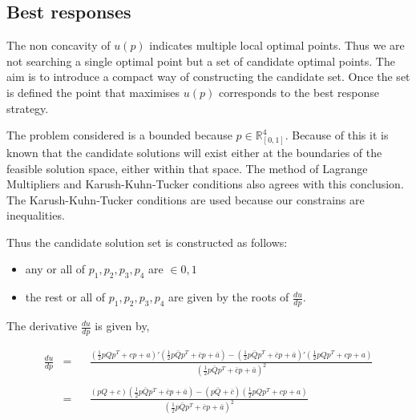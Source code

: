 \documentclass[10pt]{article}
\newcommand{\R}{\mathbb{R}}
\begin{document}
\subsection{Best responses}\label{section:memory_one_analytical}

The non concavity of \(u(p)\) indicates multiple local optimal points. Thus we
are not searching a single optimal point but a set of candidate optimal points.
The aim is to introduce a compact way of constructing the candidate set. Once
the set is defined the point that maximises \(u(p)\) corresponds to the best
response strategy.

The problem considered is a bounded because \(p \in \R^4_{[0, 1]}\). Because of
this it is known that the candidate solutions will exist either at the boundaries
of the feasible solution space, either within that space. The method of Lagrange
Multipliers and Karush-Kuhn-Tucker conditions also agrees with this conclusion. %
The Karush-Kuhn-Tucker conditions are used because our constrains are inequalities.

Thus the candidate solution set is constructed as follows:

\begin{itemize}
    \item any or all of \(p_1, p_2, p_3, p_4\) are \(\in {0, 1}\)
    \item the rest or all of \(p_1, p_2, p_3, p_4\) are given by the roots of \(\frac{du}{dp}\).
\end{itemize}

The derivative \(\frac{du}{dp}\) is given by,

\begin{equation}\label{eq:derivative_of_quadratic}
    \begin{aligned}
     \frac{du}{dp} & = && \frac{(  \frac{1}{2}p  Q  p^T + c p + a)'
      (  \frac{1}{2} p  \bar{Q}  p^T + \bar{c}  p + \bar{a}) - 
      (  \frac{1}{2} p  \bar{Q}  p^T + \bar{c}  p + \bar{a})'
      (  \frac{1}{2} p  Q  p^T + c p + a)}
      {(  \frac{1}{2} p  \bar{Q}  p^T + \bar{c}  p + \bar{a})^2} \\
      \\
    & = && \frac{(pQ + c) ( \frac{1}{2} p  \bar{Q}  p^T + \bar{c}  p + \bar{a}) 
    - (p\bar{Q} + \bar{c})( \frac{1}{2} p  Q  p^T + c p + a)}
      {( \frac{1}{2} p  \bar{Q}  p^T + \bar{c}  p + \bar{a})^2} \\
    \end{aligned}
\end{equation}
\end{document}
